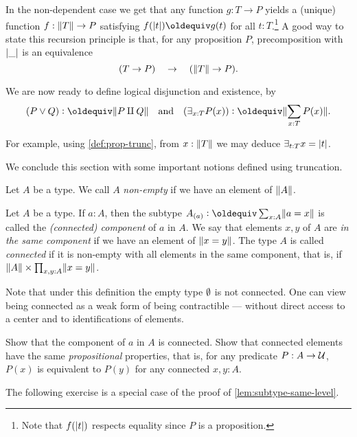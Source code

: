 In the non-dependent case we get that
any function $g: T\to P$ yields a (unique) function $f:\lVert T\rVert\to P$ 
satisfying $f(\trunc{t})\jdeq g(t)$ for all $t:T$.\footnote{%
Note that $f(\lvert t\rvert)$ respects equality since $P$ is a proposition.}
A good way to state this recursion principle is that, 
for any proposition $P$, precomposition with $\lvert\_\rvert$ is an equivalence
\[
(T \to P) \quad \to \quad (\lVert T\rVert \to P).
\]

We are now ready to define logical disjunction and existence, by
\[
(P \vee Q) \defeq \Trunc{P \amalg Q} \quad\text{and}
\quad (\exists_{x:T} P(x)) \defeq \Trunc{\sum_{x:T}P(x)}.
\]

For example, using \cref{def:prop-trunc}, 
from $x:\lVert T\rVert$ we may deduce $\exists_{t:T} x=\lvert t\rvert$.

We conclude this section with some important notions defined using truncation.

\begin{definition}\label{def:non-empty}
Let $A$ be a type. We call $A$ \emph{non-empty} if we have an element of $\lVert A\rVert$.
\end{definition}

\begin{definition}\label{def:connected}
  Let $A$ be a type. If $a:A$, then the subtype $A_{(a)}\defeq \sum_{x:A}\Trunc{a=x}$
  is called the \emph{(connected) component} of $a$ in $A$.
  We say that elements $x,y$ of $A$ are \emph{in the same component}
  if we have an element of $\lVert x=y\rVert$.
  The type $A$ is called \emph{connected} if it is non-empty with
  all elements in the same component, that is, if
  $\lVert A\rVert \times \prod_{x,y:A} \lVert x=y\rVert$.
\end{definition}

Note that under this definition the empty type $\emptyset$ is not connected.
One can view being connected as a weak form
of being contractible --- without direct access to a center and to
identifications of elements.

\begin{xca}\label{xca:component-connected}
Show that the component of $a$ in $A$ is connected.
Show that connected elements have the same 
\emph{propositional} properties, that is, 
for any predicate $P:A\to\mathcal{U}$, $P(x)$ is equivalent
to $P(y)$ for any connected $x,y:A$. 
\end{xca}

The following exercise is a special case of the proof of \cref{lem:subtype-same-level}.

